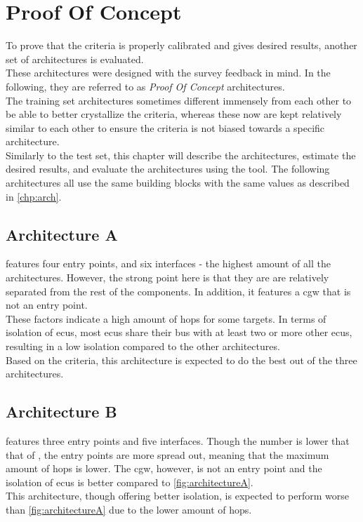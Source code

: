 \chapter{Proof Of Concept}
\label{chp:compeval}

To prove that the criteria is properly calibrated and gives desired results, another set of architectures is evaluated.\\
These architectures were designed with the survey feedback in mind.
In the following, they are referred to as \textit{Proof Of Concept} architectures.\\
The training set architectures sometimes different immensely from each other to be able to better crystallize the criteria,
whereas these now are kept relatively similar to each other to ensure the criteria is not biased towards a specific architecture.\\
Similarly to the test set, this chapter will describe the architectures, estimate the desired results, and evaluate the architectures using the tool.
The following architectures all use the same building blocks with the same values as described in \ref{chp:arch}.

\section{Architecture A}
\label{sec:archa}

 features four entry points, and six interfaces - the highest amount of all the architectures.
However, the strong point here is that they are are relatively separated from the rest of the components.
In addition, it features a \acrshort{cgw} that is not an entry point.\\
These factors indicate a high amount of hops for some targets.
In terms of isolation of \acrshort{ecu}s, most \acrshort{ecu}s share their bus with at least two or more other \acrshort{ecu}s, resulting in a low isolation compared to the other architectures.\\
Based on the criteria, this architecture is expected to do the best out of the three architectures.

\section{Architecture B}
\label{sec:archb}

 features three entry points and five interfaces.
Though the number is lower that that of , the entry points are more spread out, meaning that the maximum amount of hops is lower.
The \acrshort{cgw}, however, is not an entry point and the isolation of \acrshort{ecu}s is better compared to \ref{fig:architectureA}.\\
This architecture, though offering better isolation, is expected to perform worse than \ref{fig:architectureA} due to the lower amount of hops.
